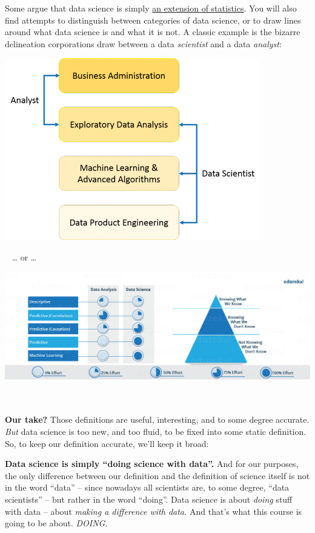 \documentclass[]{book}
\begin{document}
Some argue that data science is simply \href{https://www.statisticsviews.com/article/nate-silver-what-i-need-from-statisticians/}{an extension of statistics}. You will also find attempts to distinguish between categories of data science, or to draw lines around what data science is and what it is not. A classic example is the bizarre delineation corporations draw between a data \emph{scientist} and a data \emph{analyst}:

\includegraphics{img/venn2.png}

~
\ldots{} or \ldots{}
~

\includegraphics{img/venn3.jpg}

~

\textbf{Our take?} Those definitions are useful, interesting, and to some degree accurate. \emph{But} data science is too new, and too fluid, to be fixed into some static definition. So, to keep our definition accurate, we'll keep it broad:

\textbf{Data science is simply ``doing science with data''.} And for our purposes, the only difference between our definition and the definition of science itself is not in the word ``data'' -- since nowadays all scientists are, to some degree, ``data scientists'' -- but rather in the word ``doing''. Data science is about \emph{doing} stuff with data -- about \emph{making a difference with data.} And that's what this course is going to be about. \emph{DOING}.
\end{document}
